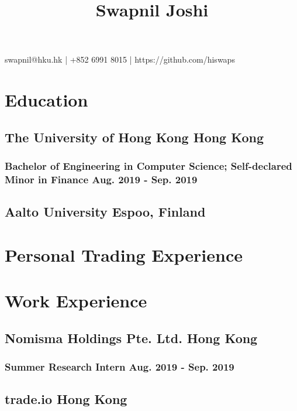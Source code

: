 \documentclass{article}
\makeatletter
\renewcommand{\maketitle}{
\begin{center}
{\huge\bfseries
\thetitle}

\vspace*{0.35cm}

swapnil@hku.hk | +852 6991 8015 | https://github.com/hiswaps

\end{center}
}
\makeatother
\begin{document}
\title{Swapnil Joshi}
\maketitle


\section{Education}
\subsection{The University of Hong Kong \hspace{4.12in} Hong Kong}
\subsubsection{Bachelor of Engineering in Computer Science; Self-declared Minor in Finance \hspace{1.27in} Aug. 2019 - Sep. 2019}


\subsection{Aalto University \hspace{4.8in} Espoo, Finland}


\section{Personal Trading Experience}


\section{Work Experience}

\subsection{Nomisma Holdings Pte. Ltd. \hspace{4.1in} Hong Kong}
\subsubsection{Summer Research Intern \hspace{4.5in} Aug. 2019 - Sep. 2019}
\subsection{trade.io \hspace{5.85in} Hong Kong}
\end{document}
